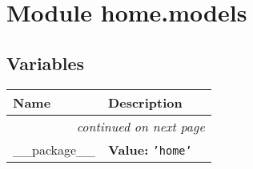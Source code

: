 %
%
%


\section{Module home.models}

    \label{home:models}


  \subsection{Variables}

    \vspace{-1cm}
\hspace{\varindent}\begin{longtable}{|p{\varnamewidth}|p{\vardescrwidth}|l}
\cline{1-2}
\cline{1-2} \centering \textbf{Name} & \centering \textbf{Description}& \\
\cline{1-2}
\endhead\cline{1-2}\multicolumn{3}{r}{\small\textit{continued on next page}}\\\endfoot\cline{1-2}
\endlastfoot\raggedright \_\-\_\-p\-a\-c\-k\-a\-g\-e\-\_\-\_\- & \raggedright \textbf{Value:} 
{\tt \texttt{'}\texttt{home}\texttt{'}}&\\
\cline{1-2}
\end{longtable}


